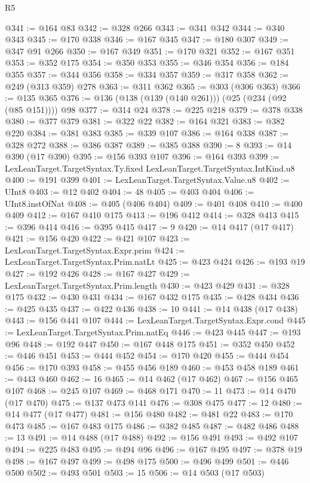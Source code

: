 \begin{lexlean}{R5}
\begin{coremodule}
@341 := @164 @83
@342 := @328 @266
@343 := @341 @342
@344 := @340 @343
@345 := @170 @338
@346 := @167 @345
@347 := @180 @307
@349 := @347 @91 @266
@350 := @167 @349
@351 := @170 @321
@352 := @167 @351
@353 := @352 @175
@354 := @350 @353
@355 := @346 @354
@356 := @184 @355
@357 := @344 @356
@358 := @334 @357
@359 := @317 @358
@362 := @249 (@313 @359) @278
@363 := @311 @362
@365 := @303 (@306 @363)
@366 := @135 @365
@376 := @136 (@138 (@139 (@140 @261))) (@25 (@234 (@92 (@85 @151)))) @98
@377 := @314 @24
@378 := @225 @218
@379 := @378 @338
@380 := @377 @379
@381 := @322 @22
@382 := @164 @321
@383 := @382 @220
@384 := @381 @383
@385 := @339 @107
@386 := @164 @338
@387 := @328 @272
@388 := @386 @387
@389 := @385 @388
@390 := 8
@393 := @14 @390 (@17 @390)
@395 := @156 @393 @107
@396 := @164 @393
@399 := LexLeanTarget.TargetSyntax.Ty.fixed LexLeanTarget.TargetSyntax.IntKind.u8
@400 := @191 @399
@401 := LexLeanTarget.TargetSyntax.Value.u8
@402 := UInt8
@403 := @12 @402
@404 := 48
@405 := @403 @404
@406 := UInt8.instOfNat
@408 := @405 (@406 @404)
@409 := @401 @408
@410 := @400 @409
@412 := @167 @410 @175
@413 := @196 @412
@414 := @328 @413
@415 := @396 @414
@416 := @395 @415
@417 := 9
@420 := @14 @417 (@17 @417)
@421 := @156 @420
@422 := @421 @107
@423 := LexLeanTarget.TargetSyntax.Expr.prim
@424 := LexLeanTarget.TargetSyntax.Prim.natLt
@425 := @423 @424
@426 := @193 @19
@427 := @192 @426
@428 := @167 @427
@429 := LexLeanTarget.TargetSyntax.Prim.length
@430 := @423 @429
@431 := @328 @175
@432 := @430 @431
@434 := @167 @432 @175
@435 := @428 @434
@436 := @425 @435
@437 := @422 @436
@438 := 10
@441 := @14 @438 (@17 @438)
@443 := @156 @441 @107
@444 := LexLeanTarget.TargetSyntax.Expr.cond
@445 := LexLeanTarget.TargetSyntax.Prim.natEq
@446 := @423 @445
@447 := @193 @96
@448 := @192 @447
@450 := @167 @448 @175
@451 := @352 @450
@452 := @446 @451
@453 := @444 @452
@454 := @170 @420
@455 := @444 @454
@456 := @170 @393
@458 := @455 @456 @189
@460 := @453 @458 @189
@461 := @443 @460
@462 := 16
@465 := @14 @462 (@17 @462)
@467 := @156 @465 @107
@468 := @245 @107
@469 := @468 @171
@470 := 11
@473 := @14 @470 (@17 @470)
@475 := @137 @473 @141
@476 := @308 @475
@477 := 12
@480 := @14 @477 (@17 @477)
@481 := @156 @480
@482 := @481 @22
@483 := @170 @473
@485 := @167 @483 @175
@486 := @382 @485
@487 := @482 @486
@488 := 13
@491 := @14 @488 (@17 @488)
@492 := @156 @491
@493 := @492 @107
@494 := @225 @483
@495 := @494 @96
@496 := @167 @495
@497 := @378 @19
@498 := @167 @497
@499 := @498 @175
@500 := @496 @499
@501 := @446 @500
@502 := @493 @501
@503 := 15
@506 := @14 @503 (@17 @503)

\end{coremodule}
\end{lexlean}
